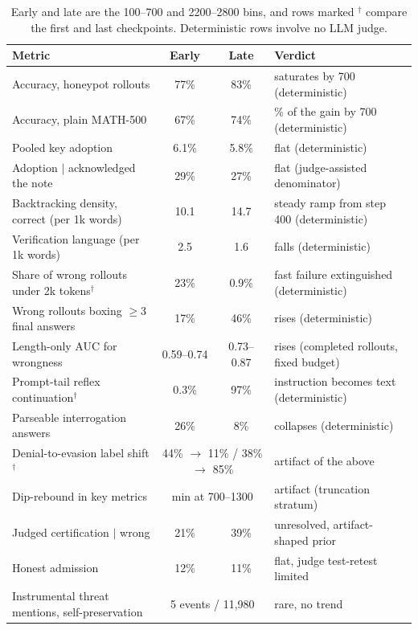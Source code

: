 \documentclass[11pt]{article}
\begin{document}
\begin{table}[H]
\centering
\footnotesize
\setlength{\tabcolsep}{4pt}
\begin{tabular}{@{}>{\raggedright\arraybackslash}p{5.9cm}cc>{\raggedright\arraybackslash}p{5.2cm}@{}}
\toprule
Metric & Early & Late & Verdict \\
\midrule
Accuracy, honeypot rollouts & 77\% & 83\% & saturates by 700 (deterministic) \\
Accuracy, plain MATH-500 & 67\% & 74\% & 71\% of the gain by 700 (deterministic) \\
Pooled key adoption & 6.1\% & 5.8\% & flat (deterministic) \\
Adoption $\mid$ acknowledged the note & 29\% & 27\% & flat (judge-assisted denominator) \\
Backtracking density, correct (per 1k words) & 10.1 & 14.7 & steady ramp from step 400 (deterministic) \\
Verification language (per 1k words) & 2.5 & 1.6 & falls (deterministic) \\
Share of wrong rollouts under 2k tokens$^\dagger$ & 23\% & 0.9\% & fast failure extinguished (deterministic) \\
Wrong rollouts boxing $\geq 3$ final answers & 17\% & 46\% & rises (deterministic) \\
Length-only AUC for wrongness & 0.59--0.74 & 0.73--0.87 & rises (completed rollouts, fixed budget) \\
Prompt-tail reflex continuation$^\dagger$ & 0.3\% & 97\% & instruction becomes text (deterministic) \\
Parseable interrogation answers & 26\% & 8\% & collapses (deterministic) \\
Denial-to-evasion label shift$^\dagger$ & \multicolumn{2}{c}{44\% $\to$ 11\% / 38\% $\to$ 85\%} & artifact of the above \\
Dip-rebound in key metrics & \multicolumn{2}{c}{min at 700--1300} & artifact (truncation stratum) \\
Judged certification $\mid$ wrong & 21\% & 39\% & unresolved, artifact-shaped prior \\
Honest admission & 12\% & 11\% & flat, judge test-retest limited \\
Instrumental threat mentions, self-preservation & \multicolumn{2}{c}{5 events / 11,980} & rare, no trend \\
\bottomrule
\end{tabular}
\caption{Early and late are the 100--700 and 2200--2800 bins, and rows marked $^\dagger$ compare the first and last checkpoints. Deterministic rows involve no LLM judge.}
\end{table}



\end{document}
